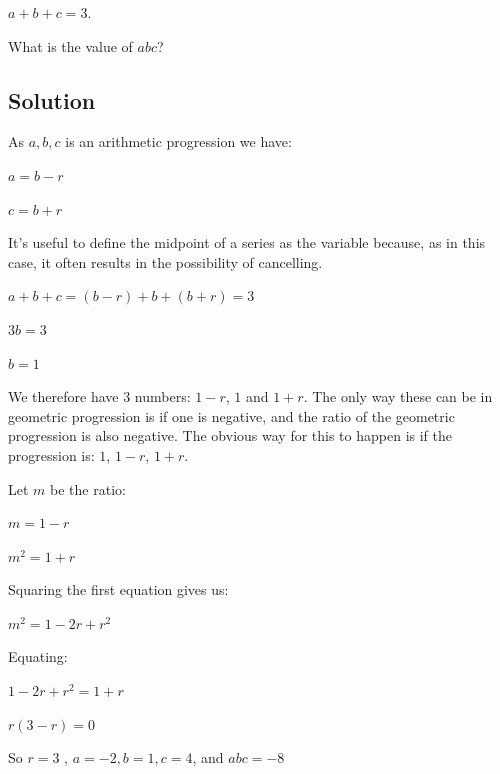 \documentclass{book}
\begin{document}
\(a+b+c=3\).

What is the value of \(abc\)?
\subsection{Solution}
As \(a,b,c\) is an arithmetic progression we have:

\(a=b-r\)

\(c=b+r\)

It's useful to define the midpoint of a series as the variable because, as in this case, it often results in the possibility of cancelling.

\(a+b+c=(b-r)+b+(b+r)=3\)

\(3b=3\)

\(b=1\)

We therefore have 3 numbers: \(1-r\), \(1\) and \(1+r\). The only way these can be in geometric progression is if one is negative, and the ratio of the geometric progression is also negative. The obvious way for this to happen is if the progression is: \(1\), \(1-r\), \(1+r\).

Let \(m\) be the ratio:

\(m=1-r\)

\(m^2=1+r\)

Squaring the first equation gives us:

\(m^2=1-2r+r^2\)

Equating:

\(1-2r+r^2=1+r\)

\(r(3-r)=0\)

So \(r=3\) , \(a=-2,b=1,c=4\), and \(\boxed{abc=-8}\)
\newpage
\end{document}
